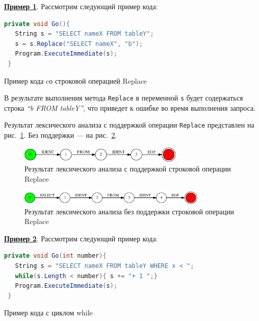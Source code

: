\textbf{\underline{Пример 1}}. 
Рассмотрим следующий пример кода:
\begin{listing}[H]
    \begin{lstlisting}[language=csharp]
 private void Go(){
   String s = "SELECT nameX FROM tableY";
   s = s.Replace("SELECT nameX", "b");
   Program.ExecuteImmediate(s);
 }
    \end{lstlisting}
\caption{Пример кода cо строковой операцией Replace}
\label{lst:exampleR}
\end{listing}

В результате выполнения метода \verb|Replace| в переменной \verb|s| будет содержаться строка \textit{``b FROM tableY''}, что приведет к ошибке во время выполнения запроса. 

Результат лексического анализа с поддержкой операции \verb|Replace| представлен на рис.~\ref{fig:replace_ex_1}. Без поддержки --- на рис.~\ref{fig:replace_ex}.  
\begin{figure}[H]
\begin{center}
\includegraphics[width=0.7\textwidth]{Polubelova/ReplaceEx}
\caption{Результат лексического анализа с поддержкой строковой операции Replace}
\label{fig:replace_ex_1} 
\end{center}
\end{figure}
\begin{figure}[H]
\begin{center}
\includegraphics[width=0.8\textwidth]{Polubelova/ReplaceEx1}
\caption{Результат лексического анализа без поддержки строковой операции Replace}
\label{fig:replace_ex} 
\end{center}
\end{figure}

\textbf{\underline{Пример 2}}. 
Рассмотрим следующий пример кода:
\begin{listing}[H]
    \begin{lstlisting}[language=csharp]
 private void Go(int number){
   String s = "SELECT nameX FROM tableY WHERE x < ";
   while(s.Length < number){ s += "+ 1 ";}
   Program.ExecuteImmediate(s);
 }
    \end{lstlisting}
\caption{Пример кода с циклом while}
\label{lst:exampleW}
\end{listing}

